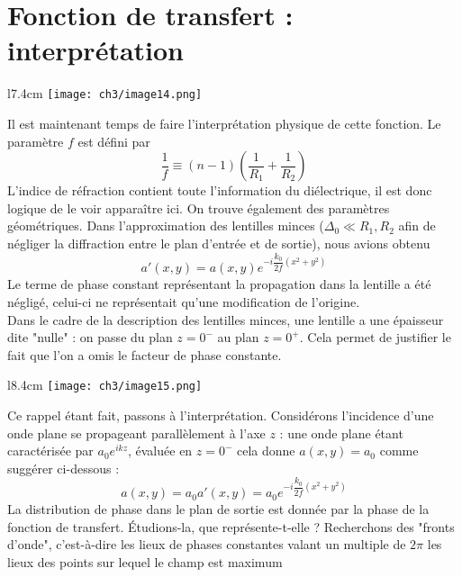 \section{Fonction de transfert : interprétation}	
	\begin{wrapfigure}[10]{l}{7.4cm}
	\vspace{-5mm}
	\texttt{[image: ch3/image14.png]}
	\end{wrapfigure}		
Il est maintenant temps de faire l'interprétation physique de cette fonction. Le paramètre $f$ est défini 
par 
\begin{equation}
\frac{1}{f} \equiv (n-1)\left(\dfrac{1}{R_1}+\dfrac{1}{R_2}\right)
\end{equation}
L'indice de réfraction contient toute l'information du diélectrique, il est donc logique de le voir 
apparaître ici. On trouve également des paramètres géométriques.  Dans l'approximation des lentilles 
minces ($\Delta_0\ll R_1,R_2$ afin de négliger la diffraction entre le plan d'entrée et de sortie), nous 
avions obtenu
\begin{equation}
a'(x,y) = a(x,y)e^{-i\dfrac{k_0}{2f}(x^2+y^2)}
\end{equation}
Le terme de phase constant représentant la propagation dans la lentille a été négligé, celui-ci ne 
représentait qu'une modification de l'origine. \\

Dans le cadre de la description des lentilles minces, une lentille a une épaisseur dite "nulle" : on 
passe du plan $z=0^-$ au plan $z=0^+$. Cela permet de justifier le fait que l'on a omis le facteur de 
phase constante. \\

	\begin{wrapfigure}[12]{l}{8.4cm}
	\vspace{-5mm}
	\texttt{[image: ch3/image15.png]}
	\end{wrapfigure}		
Ce rappel étant fait, passons à l'interprétation. Considérons l'incidence d'une onde plane se propageant 
parallèlement à l'axe $z$ : une onde plane étant caractérisée par $a_0e^{ikz}$, évaluée en $z=0^-$ cela 
donne $a(x,y)=a_0$ comme suggérer ci-dessous :
\begin{equation}
a(x,y) = a_0 a'(x,y) = a_0e^{-i\dfrac{k_0}{2f}(x^2+y^2)}
\end{equation}
La distribution de phase dans le plan de sortie est donnée par la phase de la fonction de transfert. 
Étudions-la, que représente-t-elle ? Recherchons des "fronts d'onde", c'est-à-dire les lieux de phases 
constantes valant un multiple de $2\pi$ les lieux des points sur lequel le champ est maximum

